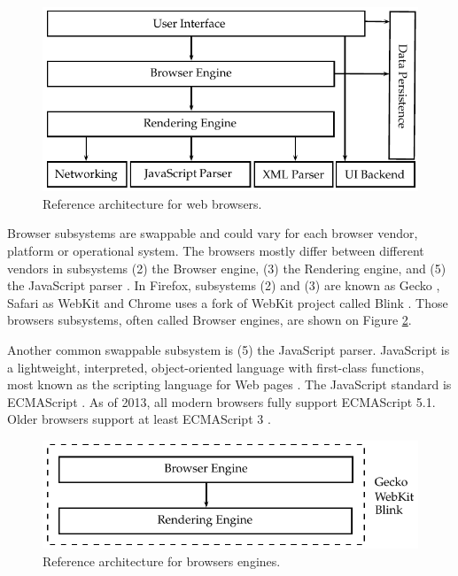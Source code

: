 \begin{figure}[!htb]
  \centering
  \includegraphics{chapters/basic_concepts/web_architecture.pdf}
  \caption{Reference architecture for web browsers.}
  \label{figure:web_architecture}
\end{figure}

Browser subsystems are swappable \cite{Grosskurth2005} and could vary for each browser vendor, platform or operational system. The browsers mostly differ between different vendors in subsystems (2) the Browser engine, (3) the Rendering engine, and (5) the JavaScript parser  \cite{Firefox2013,Safari2013,WebKit2013,Chrome2010}. In Firefox, subsystems (2) and (3) are known as Gecko \cite{Firefox2013,Gecko2013}, Safari as WebKit \cite{Safari2013,WebKit2013} and Chrome uses a fork of WebKit project called Blink \cite{Chrome2010,Blink2013}. Those browsers subsystems, often called Browser engines, are shown on Figure \ref{figure:web_architecture_engines}.

Another common swappable subsystem is (5) the JavaScript parser. JavaScript \cite{International2009} is a lightweight, interpreted, object-oriented language with first-class functions, most known as the scripting language for Web pages \cite{Gecko2013}. The JavaScript standard is ECMAScript \cite{Gecko2013,International2009}. As of 2013, all modern browsers fully support ECMAScript 5.1. Older browsers support at least ECMAScript 3 \cite{Gecko2013,International2009}.

\begin{figure}[!htb]
  \centering
  \includegraphics{chapters/basic_concepts/web_architecture_engines.pdf}
  \caption{Reference architecture for browsers engines.}
  \label{figure:web_architecture_engines}
\end{figure}

